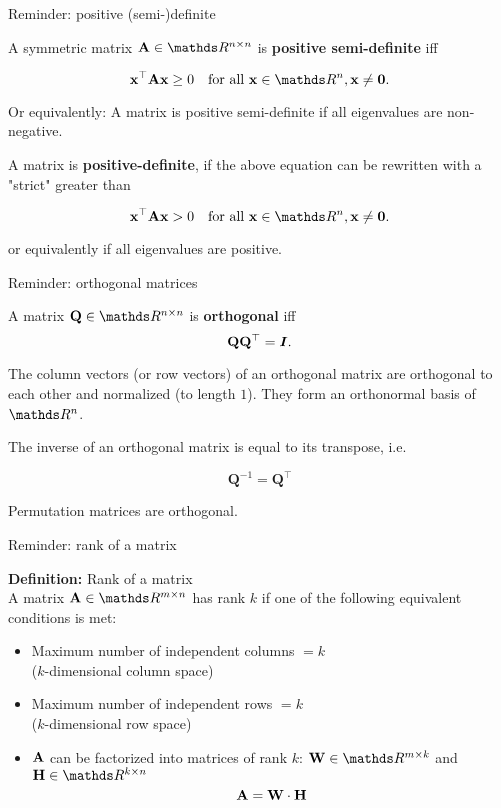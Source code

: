 \documentclass[11pt,compress,t,notes=noshow, xcolor=table]{beamer}
\begin{document}
\begin{vbframe}{Reminder: positive (semi-)definite}

A symmetric matrix $\Amat \in \R^{n \times n}$ is \textbf{positive semi-definite} iff

$$
\xv^{\top}\Amat\xv \ge 0 \quad \text{for all } \xv \in \R^n, \xv \ne \boldsymbol{0}.
$$

Or equivalently: A matrix is positive semi-definite if all eigenvalues are non-negative. 

\lz

A matrix is \textbf{positive-definite}, if the above equation can be rewritten with a "strict" greater than

$$
\xv^{\top}\Amat\xv > 0 \quad \text{for all }\xv \in \R^n, \xv \ne \boldsymbol{0}.
$$

or equivalently if all eigenvalues are positive. 

\end{vbframe}

\begin{vbframe}{Reminder: orthogonal matrices}

A matrix $\mathbf{Q} \in \R^{n \times n}$ is \textbf{orthogonal} iff
$$
\mathbf{Q}\mathbf{Q}^{\top} = \bm{I}.
$$

The column vectors (or row vectors) of an orthogonal matrix are orthogonal to each other and normalized (to length $1$). They form an orthonormal basis of $\R^n$.

\lz

The inverse of an orthogonal matrix is equal to its transpose, i.e. 

$$
\mathbf{Q}^{-1} = \mathbf{Q}^{\top}
$$

Permutation matrices are orthogonal.

\end{vbframe}

\begin{vbframe}{Reminder: rank of a matrix}

\textbf{Definition: } Rank of a matrix \\

A matrix $\Amat \in \R^{m\times n}$ has rank $k$ if one of the following equivalent conditions is met:

\begin{itemize}
\item Maximum number of independent columns $= k$ \\
($k$-dimensional column space)
\item Maximum number of independent rows $=k$ \\
($k$-dimensional row space)
\item $\mathbf{A}$ can be factorized into matrices of rank $k$: $\mathbf{W} \in \R^{m \times k}$ and $\mathbf{H} \in \R^{k\times n}$
$$
\mathbf{A} = \mathbf{W} \cdot \mathbf{H}
$$
\end{itemize}

\end{vbframe}





\endlecture
\end{document}
